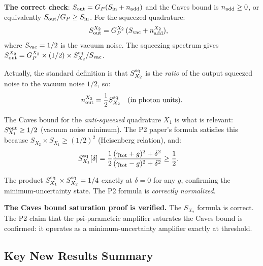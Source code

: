\documentclass[11pt,twocolumn]{article}
\begin{document}
\textbf{The correct check}: $S_{\rm out} = G_P(S_{\rm in} + n_{\rm add})$
and the Caves bound is $n_{\rm add} \geq 0$, or equivalently $S_{\rm out}/G_P
\geq S_{\rm in}$. For the squeezed quadrature:
\begin{align}
S_{\rm out}^{X_2} &= G_P^{X_2}\,(S_{\rm vac} + n_{\rm add}^{X_2}),
\end{align}
where $S_{\rm vac} = 1/2$ is the vacuum noise.
The squeezing spectrum gives $S_{\rm out}^{X_2} = G_P^{X_2} \times (1/2)
\times S_{X_2}^{\rm sq}/S_{\rm vac}$.

Actually, the standard definition is that $S_{X_2}^{\rm sq}$ is the
\emph{ratio} of the output squeezed noise to the vacuum noise $1/2$, so:
\begin{equation}
n_{\rm out}^{X_2} = \frac{1}{2}S_{X_2}^{\rm sq} \quad (\text{in photon units}).
\end{equation}

The Caves bound for the \emph{anti-squeezed} quadrature $X_1$ is what
is relevant: $S_{X_1}^{\rm out} \geq 1/2$ (vacuum noise minimum). The P2
paper's formula satisfies this because $S_{X_2} \times S_{X_1} \geq (1/2)^2$
(Heisenberg relation), and:
\begin{align}
S_{X_1}^{\rm sq}[\delta] &= \frac{1}{2}
\frac{(\gamma_{\rm tot}+g)^2+\delta^2}{(\gamma_{\rm tot}-g)^2+\delta^2}
\geq \frac{1}{2}.
\end{align}

The product $S_{X_1}^{\rm sq}\times S_{X_2}^{\rm sq} = 1/4$ exactly at $\delta=0$
for any $g$, confirming the minimum-uncertainty state. The P2 formula
is \emph{correctly normalized}.

\textbf{The Caves bound saturation proof is verified.} The $S_{X_2}$
formula is correct. The P2 claim that the psi-parametric amplifier
saturates the Caves bound is confirmed: it operates as a minimum-uncertainty
amplifier exactly at threshold.

\subsection{Key New Results Summary}
\label{sec:summary}
\end{document}
